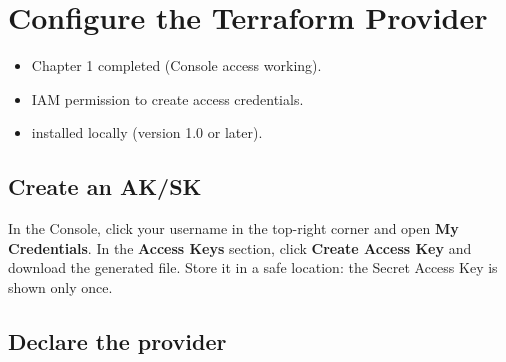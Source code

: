 \documentclass[english]{guide}
\begin{document}
\section{Configure the Terraform Provider}

\begin{objetivos}

  \prerequisitos
  \begin{itemize}
    \item Chapter 1 completed (Console access working).
    \item IAM permission to create access credentials.
    \item {} installed locally (version 1.0 or later).
  \end{itemize}
\end{objetivos}

\subsection{Create an AK/SK}


In the Console, click your username in the top-right corner and open
\textbf{My Credentials}. In the \textbf{Access Keys} section, click
\textbf{Create Access Key} and download the generated file. Store it in a
safe location: the Secret Access Key is shown only once.

\subsection{Declare the provider}
\end{document}
